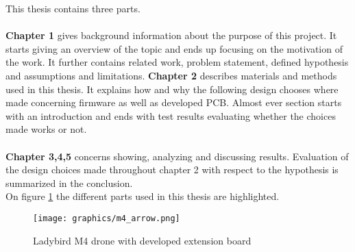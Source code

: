 This thesis contains three parts.\\ \\
\textbf{Chapter 1} gives background information about the purpose of this project.
It starts giving an overview of the topic and ends up focusing on the motivation of the work. It further contains related work,  problem statement, defined hypothesis and assumptions and limitations.
\textbf{Chapter 2} describes materials and methods used in this thesis. It explains how and why the following design chooses where made concerning firmware as well as developed PCB. Almost ever section starts with an introduction and ends with test results evaluating whether the choices made works or not.\\ \\
\textbf{Chapter 3,4,5} concerns showing, analyzing and discussing results. Evaluation of the design choices made throughout chapter 2 with respect to the hypothesis is summarized in the conclusion. \\


On figure \ref{fig:drone_with_arrows} the different parts used in this thesis are highlighted.

\begin{figure}[H]
    \center
    \texttt{[image: graphics/m4\_arrow.png]}
  \caption{Ladybird M4 drone with developed extension board}
  \label{fig:drone_with_arrows}
\end{figure}

